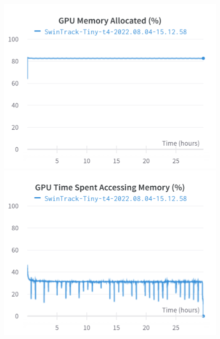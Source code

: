 \documentclass{article}
\begin{document}
\begin{figure}[h]
\includegraphics[width=\linewidth]{charts/Section-4-Panel-8-zhzcyu3xn}
\caption{}
\endminipage\hfill
{}
\includegraphics[width=\linewidth]{charts/Section-4-Panel-9-daqce0qd3}
\caption{}
\endminipage
\end{figure}
\end{document}
